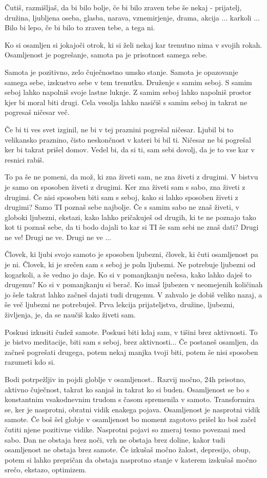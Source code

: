 Čutiš, razmišljaš, da bi bilo bolje, če bi bilo zraven tebe še nekaj - prijatelj, družina, ljubljena oseba, glasba, narava, vznemirjenje, drama, akcija ... karkoli ... Bilo bi lepo, če bi bilo to zraven tebe, a tega ni. 

Ko si osamljen si jokajoči otrok, ki si želi nekaj kar trenutno nima v svojih rokah. Osamljenost je pogrešanje, samota pa je prisotnost samega sebe. 

Samota je pozitivno, zelo čuječnostno umsko stanje. Samota je opazovanje samega sebe, izskustvo sebe v tem trenutku. Druženje s samim seboj.  S samim seboj lahko napolniš svoje lastne luknje. Z samim seboj lahko napolniš prostor kjer bi moral biti drugi. Cela vesolja lahko nasičiš s samim seboj in takrat ne pogresaš ničesar več. 

Če bi ti ves svet izginil, ne bi v tej praznini pogrešal ničesar.  Ljubil bi to velikansko praznino, čisto neskončnost v kateri bi bil ti. Ničesar ne bi pogrešal ker bi takrat prišel domov. Vedel bi, da si ti, sam sebi dovolj, da je to vse kar v resnici rabiš. 

To pa še ne pomeni, da mož, ki zna živeti sam, ne zna živeti z drugimi. V bistvu je samo on sposoben živeti z drugimi. Ker zna živeti sam s sabo, zna živeti z drugimi. Če nisi sposoben biti sam s seboj, kako si lahko sposoben živeti z drugimi? Samo TI poznaš sebe najbolje. Če s samim sabo ne znaš živeti, v globoki ljubezni, ekstazi, kako lahko pričakuješ od drugih, ki te ne poznajo tako kot ti poznaš sebe, da ti bodo dajali to kar si TI še sam sebi ne znaš dati? Drugi ne ve! Drugi ne ve. Drugi ne ve ... 

Človek, ki ljubi svojo samoto je sposoben ljubezni, človek, ki čuti osamljenost pa je ni. Človek, ki je srečen sam s seboj je poln ljubezni. Ne potrebuje ljubezni od kogarkoli, a še vedno jo daje. Ko si v pomanjkanju nečesa, kako lahko daješ to drugemu? Ko si v pomanjkanju si berač. Ko imaš ljubezen v neomejenih količinah jo šele takrat lahko začneš dajati tudi drugemu. V zahvalo je dobiš veliko nazaj, a še več ljubezni ne potrebuješ.  Prva lekcija prijateljstva, družine, ljubezni, življenja, je, da se naučiš kako živeti sam. 

Poskusi izkusiti čudež samote. Poskusi biti kdaj sam, v tišini brez aktivnosti. To je bistvo meditacije, biti sam s seboj, brez aktivnosti... Če postaneš osamljen, da začneš pogrešati drugega, potem nekaj manjka tvoji biti, potem še nisi sposoben razumeti kdo si. 

Bodi potrpežljiv in pojdi globlje v osamljenost.. Razvij močno, 24h prisotno, aktivno čuječnost, takrat ko sanjaš in takrat ko si buden. Osamljenost se bo s konstantnim vsakodnevnim trudom s časom spremenila v samoto. Transformira se, ker je nasprotni, obratni vidik enakega pojava. Osamljenost je nasprotni vidik samote. Če boš šel globje v osamljenost bo moment zagotovo prišel ko boš začel čutiti njene pozitivne vidike. Nasprotni pojavi so zmeraj tesno povezani med sabo. Dan ne obstaja brez noči, vrh ne obstaja brez doline, kakor tudi osamljenost ne obstaja brez samote. Če izkušaš močno žalost, depresijo, obup, potem si lahko prepričan da obstaja nasprotno stanje v katerem izskušaš močno srečo, ekstazo, optimizem. 


